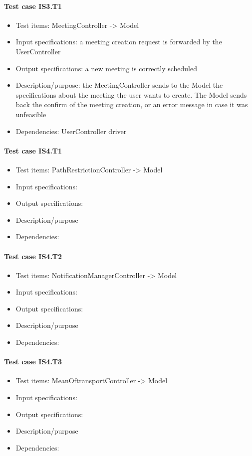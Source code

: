 \documentclass[a4paper,leqno]{article}
\begin{document}
\paragraph{Test case IS3.T1}
\begin{itemize}
	\item Test items: MeetingController -> Model
	\item Input specifications: a meeting creation request is forwarded by the UserController
	\item Output specifications: a new meeting is correctly scheduled
	\item Description/purpose: the MeetingController sends to the Model the specifications about the meeting the user wants to create. The Model sends back the confirm of the meeting creation, or an error message in case it was unfeasible
	\item Dependencies: UserController driver
\end{itemize}

\paragraph{Test case IS4.T1}
\begin{itemize}
	\item Test items: PathRestrictionController -> Model
	\item Input specifications:
	\item Output specifications:
	\item Description/purpose
	\item Dependencies:
\end{itemize}

\paragraph{Test case IS4.T2}
\begin{itemize}
	\item Test items: NotificationManagerController -> Model
	\item Input specifications:
	\item Output specifications:
	\item Description/purpose
	\item Dependencies:
\end{itemize}

\paragraph{Test case IS4.T3}
\begin{itemize}
	\item Test items: MeanOftransportController -> Model
	\item Input specifications:
	\item Output specifications:
	\item Description/purpose
	\item Dependencies:
\end{itemize}
\end{document}
